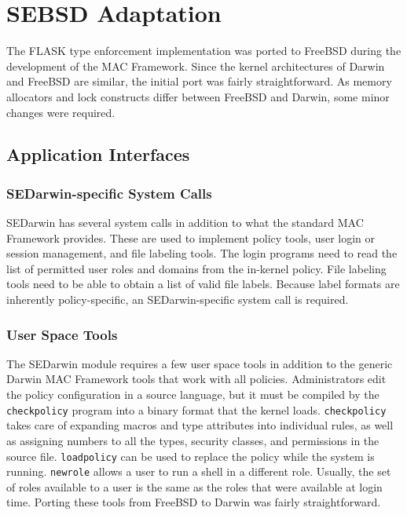 \section{SEBSD Adaptation}

The FLASK type enforcement implementation was ported to FreeBSD
during the development of the MAC Framework.  Since the kernel
architectures of Darwin and FreeBSD are similar, the initial port
was fairly straightforward. As memory allocators and lock constructs
differ between FreeBSD and Darwin, some minor changes were required.

\subsection{Application Interfaces}

\subsubsection{SEDarwin-specific System Calls}

SEDarwin has several system calls in addition to what the standard
MAC Framework provides.  These are used to implement policy tools,
user login or session management, and file labeling tools. The login
programs need to read the list of permitted user roles and domains
from the in-kernel policy.  File labeling tools need to be able
to obtain a list of valid file labels.  Because label formats are
inherently policy-specific, an SEDarwin-specific system call is
required.

\subsubsection{User Space Tools}

The SEDarwin module requires a few user space tools in addition to the generic
Darwin MAC Framework tools that work with all policies. Administrators edit the policy
configuration in a source language, but it must be compiled by the
{\tt checkpolicy} program into a binary format that the kernel loads. {\tt checkpolicy}
takes care of expanding macros and type attributes into individual rules, as
well as assigning numbers to all the types, security classes, and permissions
in the source file. {\tt loadpolicy} can be used to replace the policy while
the system is running. {\tt newrole} allows a user to run a shell in a
different role. Usually, the set of roles available to a user is the same as the roles
that were available at login time.  Porting these tools from FreeBSD to Darwin 
was fairly straightforward.

